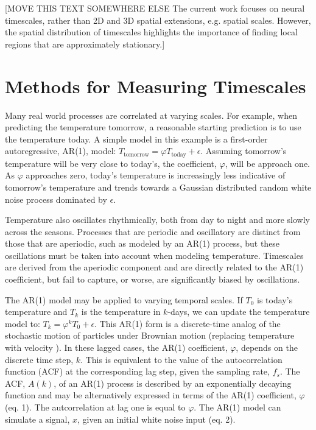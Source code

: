 \documentclass[pdflatex,sn-mathphys-num]{sn-jnl}
\begin{document}
[MOVE THIS TEXT SOMEWHERE ELSE The current work focuses on neural timescales, rather than 2D and 3D spatial extensions, e.g. spatial scales. However, the spatial distribution of timescales highlights the importance of finding local regions that are approximately stationary.]

\section{Methods for Measuring Timescales}
Many real world processes are correlated at varying scales. For example, when predicting the temperature tomorrow, a reasonable starting prediction is to use the temperature today. A simple model in this example is a first-order autoregressive, AR(1), model: $T_{\text{tomorrow}} = \varphi T_{\text{today}} + \epsilon$. Assuming tomorrow's temperature will be very close to today's, the coefficient, $\varphi$, will be approach one. As $\varphi$ approaches zero, today's temperature is increasingly less indicative of tomorrow's temperature and trends towards a Gaussian distributed random white noise process dominated by $\epsilon$.

Temperature also oscillates rhythmically, both from day to night and more slowly across the seasons. Processes that are periodic and oscillatory are distinct from those that are aperiodic, such as modeled by an AR(1) process, but these oscillations must be taken into account when modeling temperature. Timescales are derived from the aperiodic component and are directly related to the AR(1) coefficient, but fail to capture, or worse, are significantly biased by oscillations.

The AR(1) model may be applied to varying temporal scales. If $T_0$ is today's temperature and $T_k$ is the temperature in $k$-days, we can update the temperature model to: $T_k = \varphi^k T_0 + \epsilon$. This AR(1) form is a discrete-time analog of the stochastic motion of particles under Brownian motion (replacing temperature with velocity \cite{uhlenbeck_theory_1930}). In these lagged cases, the AR(1) coefficient, $\varphi$, depends on the discrete time step, $k$. This is equivalent to the value of the autocorrelation function (ACF) at the corresponding lag step, given the sampling rate, $f_s$. The ACF, $A(k)$, of an AR(1) process is described by an exponentially decaying function and may be alternatively expressed in terms of the AR(1) coefficient, $\varphi$ (eq. 1). The autcorrelation at lag one is equal to $\varphi$. The AR(1) model can simulate a signal, $x$, given an initial white noise input (eq. 2).
\end{document}
